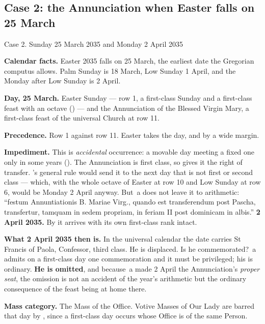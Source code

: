 \subsection{Case 2: the Annunciation when Easter falls on 25 March}

\begin{casebox}{Case 2. Sunday 25 March 2035 and Monday 2 April 2035}

\textbf{Calendar facts.} Easter 2035 falls on 25 March, the earliest date the
Gregorian computus allows. Palm Sunday is 18 March, Low Sunday 1 April, and
the Monday after Low Sunday is 2 April.

\begin{steps}
\item \textbf{Day, 25 March.} Easter Sunday --- row 1, a first-class Sunday and
a first-class feast with an octave () --- and the Annunciation of the
Blessed Virgin Mary, a first-class feast of the universal Church at row 11.

\item \textbf{Precedence.} Row 1 against row 11. Easter takes the day, and by a
wide margin.

\item \textbf{Impediment.} This is \emph{accidental} occurrence: a movable day
meeting a fixed one only in some years (). The Annunciation is
first class, so  gives it the right of transfer. 's general rule
would send it to the next day that is not first or second class --- which,
with the whole octave of Easter at row 10 and Low Sunday at row 6, would be
Monday 2 April anyway. But \,a does not leave it to arithmetic: ``festum
Annuntiationis B. Mariae Virg., quando est transferendum post Pascha,
transfertur, tamquam in sedem propriam, in feriam II post dominicam in
albis.'' \textbf{2 April 2035.} By  it arrives with its own first-class
rank intact.

\item \textbf{What 2 April 2035 then is.} In the universal calendar the date
carries St Francis of Paola, Confessor, third class. He is displaced. Is he
commemorated? \,a admits on a first-class day one commemoration and it
must be privileged; his is ordinary. \textbf{He is omitted}, and because
\,a made 2 April the Annunciation's \emph{proper seat}, the omission is
not an accident of the year's arithmetic but the ordinary consequence of the
feast being at home there.

\item \textbf{Mass category.} The Mass of the Office. Votive Masses of Our
Lady are barred that day by , since a first-class day occurs whose
Office is of the same Person.


\end{steps}
\end{casebox}
